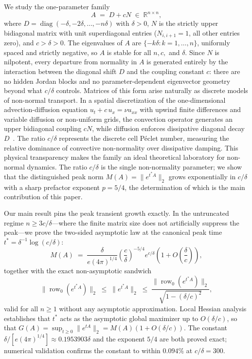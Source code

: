\documentclass[11pt,reqno]{article}
\theoremstyle{plain}
\theoremstyle{definition}
\theoremstyle{remark}
\numberwithin{equation}{section}
\begin{document}
We study the one-parameter family
\begin{equation}\label{eq:family}
  A \;=\; D + cN \;\in\; \mathbb{R}^{n\times n},
\end{equation}
where $D = \operatorname{diag}(-\delta, -2\delta, \dots, -n\delta)$ with $\delta > 0$, $N$ is the strictly upper bidiagonal matrix with unit superdiagonal entries ($N_{i,i+1} = 1$, all other entries zero), and $c > \delta > 0$. The eigenvalues of $A$ are $\{-k\delta : k = 1, \dots, n\}$, uniformly spaced and strictly negative, so $A$ is stable for all $n, c,$ and $\delta$. Since $N$ is nilpotent, every departure from normality in $A$ is generated entirely by the interaction between the diagonal shift $D$ and the coupling constant $c$: there are no hidden Jordan blocks and no parameter-dependent eigenvector geometry beyond what $c/\delta$ controls. Matrices of this form arise naturally as discrete models of non-normal transport. In a spatial discretization of the one-dimensional advection-diffusion equation $u_t + c\,u_x = \nu u_{xx}$ with upwind finite differences and variable diffusion or non-uniform grids, the convection operator generates an upper bidiagonal coupling $cN$, while diffusion enforces dissipative diagonal decay $D$~\cite{Trefethen2005}. The ratio $c/\delta$ represents the discrete cell P\'eclet number, measuring the relative dominance of convective non-normality over dissipative damping. This physical transparency makes the family an ideal theoretical laboratory for non-normal dynamics. The ratio $c/\delta$ is the single non-normality parameter; we show that the distinguished peak norm $M(A) = \|e^{t^*A}\|_2$ grows exponentially in $c/\delta$ with a sharp prefactor exponent $p = 5/4$, the determination of which is the main contribution of this paper.

Our main result pins the peak transient growth exactly. In the untruncated regime $n \ge 3c/\delta$---where the finite matrix size does not artificially suppress the peak---we prove the two-sided asymptotic law at the canonical peak time $t^* = \delta^{-1}\log(c/\delta)$:
\begin{equation}\label{eq:maininformal}
  M(A) \;=\; \frac{\delta}{e (4\pi)^{1/4}} \left(\frac{c}{\delta}\right)^{-5/4} e^{c/\delta} \left(1 + O\left(\frac{\delta}{c}\right)\right),
\end{equation}
together with the exact non-asymptotic sandwich
\begin{equation}\label{eq:sandwichinformal}
  \|\operatorname{row}_0(e^{t^*A})\|_2 \;\le\; \|e^{t^*A}\|_2 \;\le\; \frac{\|\operatorname{row}_0(e^{t^*A})\|_2}{\sqrt{1 - (\delta/c)^2}},
\end{equation}
valid for all $n \ge 1$ without any asymptotic approximation. Local Hessian analysis establishes that $t^*$ acts as the asymptotic global maximizer up to $O(\delta/c)$, so that $G(A) = \sup_{t \ge 0} \|e^{tA}\|_2 = M(A)(1 + O(\delta/c))$. The constant $\delta/[e(4\pi)^{1/4}] \approx 0.1953903\delta$ and the exponent $5/4$ are both proved exact; numerical validation confirms the constant to within $0.094\%$ at $c/\delta = 300$.
\end{document}
